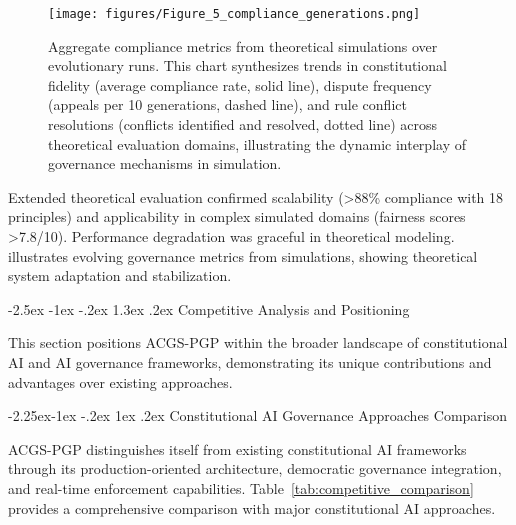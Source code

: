 \documentclass[manuscript,screen,9pt]{acmart}
\makeatletter
\renewcommand\section{\@startsection{section}{1}{\z@}%
  {-2.5ex \@plus -1ex \@minus -.2ex}%
  {1.3ex \@plus.2ex}%
  {\normalfont\Large\bfseries}}
\renewcommand\subsection{\@startsection{subsection}{2}{\z@}%
  {-2.25ex\@plus -1ex \@minus -.2ex}%
  {1ex \@plus .2ex}%
  {\normalfont\large\bfseries}}
\makeatother
\begin{document}
\FloatBarrier %
\begin{figure}[!htb]
	\centering
	\texttt{[image: figures/Figure\_5\_compliance\_generations.png]}
	\caption{Aggregate compliance metrics from theoretical simulations over evolutionary runs. This chart synthesizes trends in constitutional fidelity (average compliance rate, solid line), dispute frequency (appeals per 10 generations, dashed line), and rule conflict resolutions (conflicts identified and resolved, dotted line) across theoretical evaluation domains, illustrating the dynamic interplay of governance mechanisms in simulation.}
	\label{fig:compliance-trends}
\end{figure}

Extended theoretical evaluation confirmed scalability (>88\% compliance with 18 principles) and applicability in complex simulated domains (fairness scores >7.8/10). Performance degradation was graceful in theoretical modeling.  illustrates evolving governance metrics from simulations, showing theoretical system adaptation and stabilization.

\section{Competitive Analysis and Positioning}
\label{sec:competitive_analysis}

This section positions ACGS-PGP within the broader landscape of constitutional AI and AI governance frameworks, demonstrating its unique contributions and advantages over existing approaches.

\subsection{Constitutional AI Governance Approaches Comparison}

ACGS-PGP distinguishes itself from existing constitutional AI frameworks through its production-oriented architecture, democratic governance integration, and real-time enforcement capabilities. Table~\ref{tab:competitive_comparison} provides a comprehensive comparison with major constitutional AI approaches.
\end{document}
